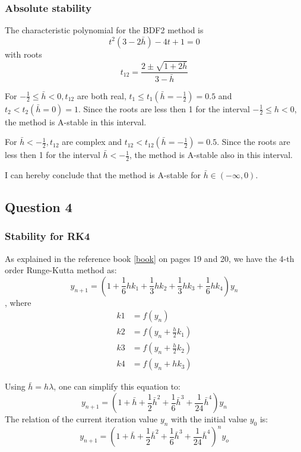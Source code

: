 \documentclass[a4paper, 11pt]{article}
\begin{document}
			\subsubsection*{Absolute stability}
				The characteristic polynomial for the BDF2 method is
				\begin{equation}
					t^2 (3 - 2 \bar{h}) - 4t + 1 = 0
				\end{equation}
				with roots
				\begin{equation}
					t_{12} =  \frac{2 \pm \sqrt{1+2\bar{h}}}{3-\bar{h}}
				\end{equation}
				
				For $-\frac{1}{2} \le \bar{h} < 0, t_{12}$ are both real, $t_{1} \le t_1(\bar{h}=-\frac{1}{2})= 0.5$ and $t_{2} < t_2(\bar{h}=0)= 1$.
				Since the roots are less then 1 for the interval $-\frac{1}{2} \le h < 0$, the method is A-stable in this interval.
				
				For $\bar{h} <-\frac{1}{2},  t_{12}$ are complex and $t_{12} < t_{12}(\bar{h}=-\frac{1}{2})= 0.5$.
				Since the roots are less then 1 for the interval $\bar{h} <-\frac{1}{2}$, the method is A-stable also in this interval.
				
				I can hereby conclude that the method is A-stable for $\bar{h} \in (-\infty,0)$.
						
		\subsection*{Question 4}
			\subsubsection*{Stability for RK4}
				As explained in the reference book \ref{book} on pages 19 and 20, we have the 4-th order Runge-Kutta method as:
				\begin{equation}
					y_{n+1} = (1 + \frac{1}{6}hk_1 + \frac{1}{3}hk_2 + \frac{1}{3}hk_3 + \frac{1}{6}hk_4)y_n
				\end{equation}
				, where
				\begin{align}
						k1 &= f(y_{n}) \\
						k2 &= f(y_{n} + \frac{h}{2} k_1) \\
						k3 &= f(y_{n} + \frac{h}{2} k_2) \\
						k4 &= f(y_{n} + h k_3)
					\end{align}
			
				Using $ \bar{h} = h\lambda $, one can simplify this equation to:
				\begin{equation}
					y_{n+1} = (1 + \bar{h} + \frac{1}{2}\bar{h}^2 + \frac{1}{6}\bar{h}^3 + \frac{1}{24}\bar{h}^4)y_n
				\end{equation}
				The relation of the current iteration value $y_n$ with the initial value $y_0$ is:
				\begin{equation}
					y_{n+1} = (1 + \bar{h} + \frac{1}{2}\bar{h}^2 + \frac{1}{6}\bar{h}^3 + \frac{1}{24}\bar{h}^4)^n y_o
				\end{equation}
			
\end{document}
